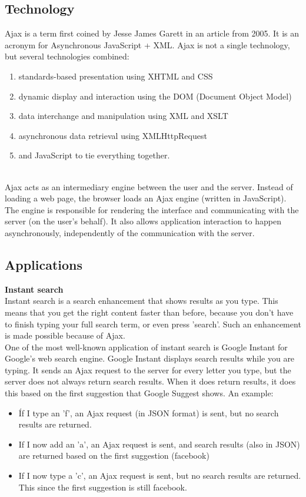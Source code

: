 \subsection{Technology}
Ajax is a term first coined by Jesse James Garett in an article from 2005. It is an acronym for Asynchronous JavaScript + XML. Ajax is not a single technology, but several technologies combined:\\
\begin{enumerate}
	\item standards-based presentation using XHTML and CSS
	\item dynamic display and interaction using the DOM (Document Object Model)
	\item data interchange and manipulation using XML and XSLT
	\item asynchronous data retrieval using XMLHttpRequest
	\item and JavaScript to tie everything together.
\end{enumerate} 
~\\
Ajax acts as an intermediary engine between the user and the server. Instead of loading a web page, the browser loads an Ajax engine (written in JavaScript). The engine is responsible for rendering the interface and communicating with the server (on the user's behalf). It also allows application interaction to happen asynchronously, independently of the communication with the server.
	
\subsection{Applications}
		
\textbf{Instant search}\\
Instant search is a search enhancement that shows results as you type. This means that you get the right content faster than before, because you don't have to finish typing your full search term, or even press 'search'. Such an enhancement is made possible because of Ajax.\\
	
One of the most well-known application of instant search is Google Instant for Google's web search engine. Google Instant displays search results while you are typing. It sends an Ajax request to the server for every letter you type, but the server does not always return search results. When it does return results, it does this based on the first suggestion that Google Suggest shows. An example:
\begin{itemize}
	\setlength\itemsep{0em}
	\item Íf I type an 'f', an Ajax request (in JSON format) is sent, but no search results are returned.
	\item If I now add an 'a', an Ajax request is sent, and search results (also in JSON) are returned based on the first suggestion (facebook)
	\item If I now type a 'c', an Ajax request is sent, but no search results are returned. This since the first suggestion is still facebook.
\end{itemize}
	
